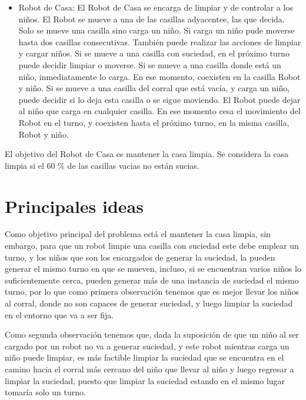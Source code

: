 \documentclass[]{article}
\begin{document}
\begin{itemize}
	\item Robot de Casa: El Robot de Casa se encarga de limpiar y de controlar a los niños. El
	Robot se mueve a una de las casillas adyacentee, las que decida. Solo se mueve una casilla
	sino carga un niño. Si carga un niño pude moverse hasta dos casillas consecutivas.
	También puede realizar las acciones de limpiar y cargar niños. Si se mueve a una casilla
	con suciedad, en el próximo turno puede decidir limpiar o moverse. Si se mueve a una
	casilla donde está un niño, inmediatamente lo carga. En ese momento, coexisten en la
	casilla Robot y niño.
	Si se mueve a una casilla del corral que está vacía, y carga un niño, puede decidir si lo
	deja esta casilla o se sigue moviendo. El Robot puede dejar al niño que carga en cualquier
	casilla. En ese momento cesa el movimiento del Robot en el turno, y coexisten hasta el
	próximo turno, en la misma casilla, Robot y niño.
\end{itemize}

El objetivo del Robot de Casa es mantener la casa limpia. Se considera la casa limpia si el
60 \% de las casillas vacias no están sucias.


\section{Principales ideas}

\begin{flushleft}
	Como objetivo principal del problema está el mantener la casa limpia, sin embargo, para que un robot limpie una casilla con suciedad este debe emplear un turno, y los niños que son los encargados de generar la suciedad, la pueden generar el mismo turno en que se mueven, incluso, si se encuentran varios niños  lo suficientemente cerca, pueden generar más de una instancia de suciedad el mismo turno, por lo que como primera observación tenemos que es mejor llevar los niños al corral, donde no son capaces de generar suciedad, y luego limpiar la suciedad en el entorno que va a ser fija.
\end{flushleft}

\begin{flushleft}
	Como segunda observación tenemos que, dada la suposición de que un niño al ser cargado por un robot no va a generar suciedad, y este robot mientras carga un niño puede limpiar, es más factible limpiar la suciedad que se encuentra en el camino hacia el corral más cercano del niño que llevar al niño y luego regresar a limpiar la suciedad, puesto que limpiar la suciedad estando en el mismo lugar tomaría solo un turno.
\end{flushleft}
\end{document}
